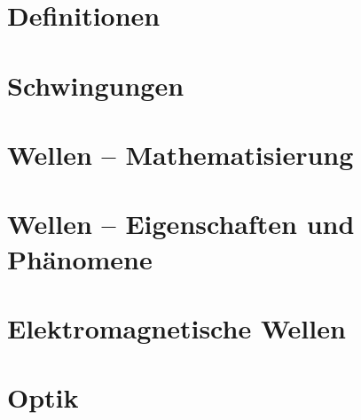 \section{Definitionen} \label{sec:definitionen}



\section{Schwingungen} \label{sec:schwingungen}



\section{Wellen -- Mathematisierung} \label{sec:wellen}



\section{Wellen -- Eigenschaften und Phänomene} \label{sec:wellen_eigenschaften}



\section{Elektromagnetische Wellen} \label{sec:em_wellen}



\section{Optik} \label{sec:optik}



